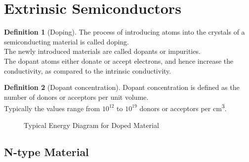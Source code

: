 \documentclass[titlepage, fleqn, a4paper, 12pt, twoside]{article}
\theoremstyle{definition}
\newtheorem{definition}{Definition}
\theoremstyle{theorem}
\begin{document}
\section{Extrinsic Semiconductors}

\begin{definition}[Doping]
	The process of introducing atoms into the crystals of a semiconducting material is called doping.\\
	The newly introduced materials are called dopants or impurities.\\
	The dopant atoms either donate or accept electrons, and hence increase the conductivity, as compared to the intrinsic conductivity.
\end{definition}

\begin{definition}[Dopant concentration]
	Dopant concentration is defined as the number of donors or acceptors per unit volume.\\
	Typically the values range from $10^{12}$ to $10^{19}$ donors or acceptors per \si{\cubic\centi\metre}.
\end{definition}

\begin{figure}[h]
	\centering
	\caption{Typical Energy Diagram for Doped Material}
\end{figure}

\subsection{N-type Material}
\end{document}
